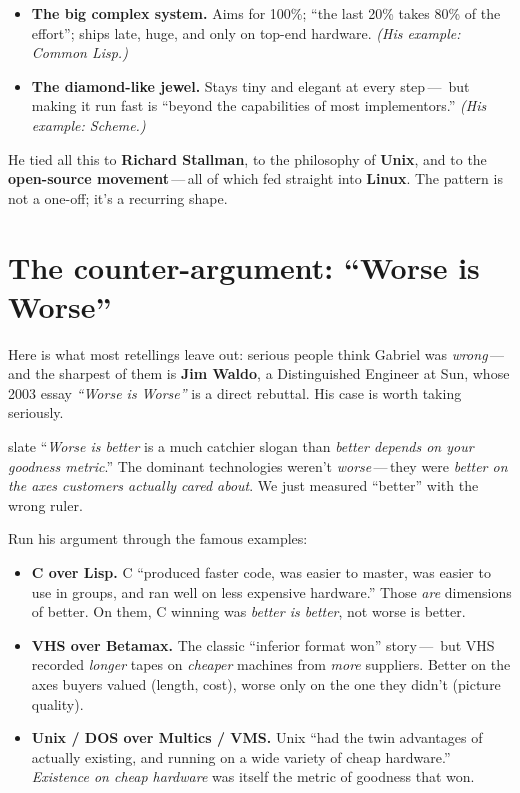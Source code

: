 \documentclass[11pt]{article}
\let\oldsection\section
\renewcommand{\section}[1]{\oldsection{\sffamily\bfseries\large #1}}
\newenvironment{counterbox}[1][Counterpoint]{\begin{sidebox}[\faBalanceScale\ \ #1]{slate}}{\end{sidebox}}
\begin{document}
\begin{itemize}[leftmargin=1.4em]
  \item \textbf{The big complex system.} Aims for 100\%; ``the last 20\% takes
        80\% of the effort''; ships late, huge, and only on top-end hardware.
        \emph{(His example: Common Lisp.)}
  \item \textbf{The diamond-like jewel.} Stays tiny and elegant at every step\,---\,
        but making it run fast is ``beyond the capabilities of most
        implementors.'' \emph{(His example: Scheme.)}
\end{itemize}

He tied all this to \textbf{Richard Stallman}, to the philosophy of \textbf{Unix},
and to the \textbf{open-source movement}\,---\,all of which fed straight into
\textbf{Linux}. The pattern is not a one-off; it's a recurring shape.

\section{The counter-argument: ``Worse is Worse''}

Here is what most retellings leave out: serious people think Gabriel was
\emph{wrong}\,---\,and the sharpest of them is \textbf{Jim Waldo}, a Distinguished
Engineer at Sun, whose 2003 essay \emph{``Worse is Worse''} is a direct rebuttal.
His case is worth taking seriously.

\begin{counterbox}[Waldo's thesis]
``\emph{Worse is better} is a much catchier slogan than \emph{better depends on
your goodness metric}.'' The dominant technologies weren't \emph{worse}\,---\,they
were \emph{better on the axes customers actually cared about}. We just measured
``better'' with the wrong ruler.
\end{counterbox}

Run his argument through the famous examples:

\begin{itemize}[leftmargin=1.4em]
  \item \textbf{C over Lisp.} C ``produced faster code, was easier to master,
        was easier to use in groups, and ran well on less expensive hardware.''
        Those \emph{are} dimensions of better. On them, C winning was
        \emph{better is better}, not worse is better.
  \item \textbf{VHS over Betamax.} The classic ``inferior format won'' story\,---\,
        but VHS recorded \emph{longer} tapes on \emph{cheaper} machines from
        \emph{more} suppliers. Better on the axes buyers valued (length, cost),
        worse only on the one they didn't (picture quality).
  \item \textbf{Unix / DOS over Multics / VMS.} Unix ``had the twin advantages of
        actually existing, and running on a wide variety of cheap hardware.''
        \emph{Existence on cheap hardware} was itself the metric of goodness that
        won.
\end{itemize}
\end{document}
